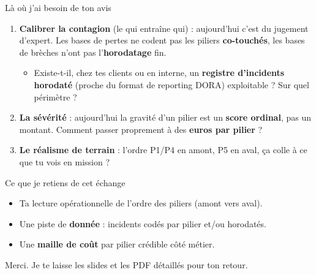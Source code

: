 \documentclass[11pt]{beamer}
\begin{document}
\begin{frame}{Là où j'ai besoin de ton avis}
\small
\begin{enumerate}
\item \textbf{Calibrer la contagion} (le \og{}qui entraîne qui\fg{}) : aujourd'hui c'est du
      jugement d'expert. Les bases de pertes ne codent pas les piliers \textbf{co-touchés},
      les bases de brèches n'ont pas l'\textbf{horodatage} fin.
      \begin{itemize}\small
      \item Existe-t-il, chez tes clients ou en interne, un \textbf{registre d'incidents
            horodaté} (proche du format de reporting DORA) exploitable ? Sur quel périmètre ?
      \end{itemize}
\item \textbf{La sévérité} : aujourd'hui la gravité d'un pilier est un \textbf{score
      ordinal}, pas un montant. Comment passer proprement à des \textbf{euros par pilier} ?
\item \textbf{Le réalisme de terrain} : l'ordre P1/P4 en amont, P5 en aval, ça colle à ce
      que tu vois en mission ?
\end{enumerate}
\end{frame}

\begin{frame}{Ce que je retiens de cet échange}
\begin{itemize}
\item Ta lecture opérationnelle de l'ordre des piliers (amont vers aval).
\item Une piste de \textbf{donnée} : incidents codés par pilier et/ou horodatés.
\item Une \textbf{maille de coût} par pilier crédible côté métier.
\end{itemize}
\vfill
\begin{center}
Merci. Je te laisse les slides et les PDF détaillés pour ton retour.
\end{center}
\end{frame}
\end{document}
